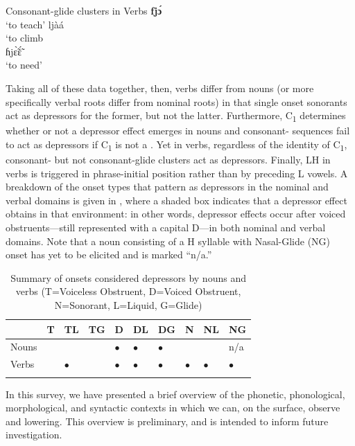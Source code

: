 \documentclass[output=paper,newtxmath,modfonts,nonflat,hidelinks]{langsci/langscibook}
\begin{document}
\ea\label{ex:lotven:10}Consonant-glide clusters in  Verbs
\ea\label{ex:lotven:10a}
    \textbf{fjɔ́}\\
    \glt ‘to teach’
\ex\label{ex:lotven:10b}
	ljàá\\
    \glt ‘to climb\\
\ex\label{ex:lotven:10c}
	ɦjɛ̃̀ɛ̃́\\
    \glt ‘to need’
\z
\z
        

Taking all of these data together, then, verbs differ from nouns (or more specifically verbal roots differ from nominal roots) in that single onset sonorants act as depressors for the former, but not the latter. Furthermore, C\textsubscript{1} determines whether or not a depressor effect emerges in nouns and consonant- sequences fail to act as depressors if C\textsubscript{1} is not a . Yet in verbs, regardless of the identity of C\textsubscript{1}, consonant- but not consonant-glide clusters act as depressors. Finally, LH  in verbs is triggered in phrase-initial position rather than by preceding L  vowels. A breakdown of the onset types that pattern as depressors in the nominal and verbal domains is given in 
, where a shaded box indicates that a depressor effect obtains in that environment: in other words, depressor effects occur after voiced obstruents—still represented with a capital D—in both nominal and verbal domains. Note that a noun consisting of a H  syllable with Nasal-Glide (NG) onset has yet to be elicited and is marked “n/a.”

\begin{table}
\begin{tabularx}{\textwidth}{Xlllllllll}
\lsptoprule
& {T} & {TL} & {TG} & {D} & {DL} & {DG} & {N} & {NL} & {NG}\\
\midrule
Nouns &  &  &  & $\bullet$ & $\bullet$ & $\bullet$ &  &  & n/a\\
Verbs &  & $\bullet$ &  & $\bullet$ & $\bullet$ & $\bullet$ & $\bullet$ & $\bullet$ & $\bullet$ \\
\lspbottomrule
\end{tabularx}
\caption{Summary of onsets considered depressors by nouns and verbs (T=Voiceless Obstruent, D=Voiced Obstruent, N=Sonorant, L=Liquid, G=Glide)}
\label{fig:lotven:6}
\end{table}

In this survey, we have presented a brief overview of the phonetic, phonological, morphological, and syntactic contexts in which we can, on the surface, observe   and  lowering. This overview is preliminary, and is intended to inform future investigation.
\end{document}
